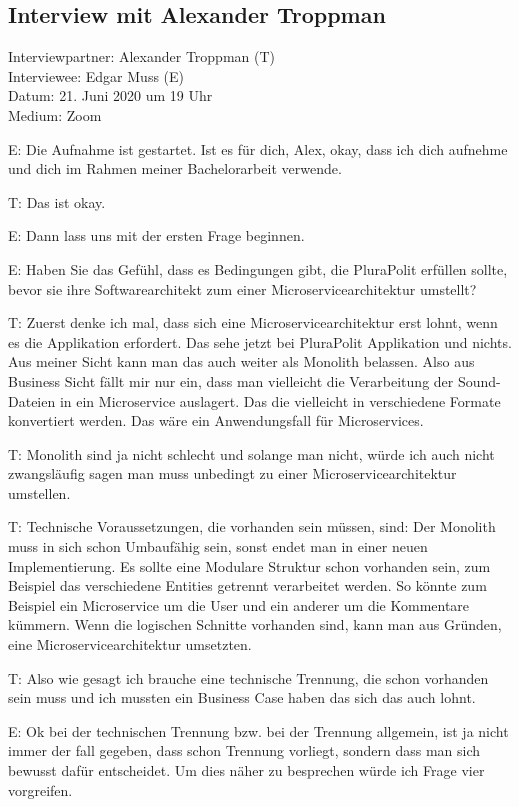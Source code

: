 \subsection{Interview mit Alexander Troppman}
\label{appendix:troppman}

Interviewpartner: Alexander Troppman (T) \\
Interviewee: Edgar Muss (E) \\
Datum: 21. Juni 2020 um 19 Uhr \\
Medium: Zoom

E: Die Aufnahme ist gestartet. Ist es für dich, Alex, okay, dass ich dich aufnehme und dich im Rahmen meiner Bachelorarbeit verwende.

T: Das ist okay.

E: Dann lass uns mit der ersten Frage beginnen.

E: Haben Sie das Gefühl, dass es Bedingungen gibt, die PluraPolit erfüllen sollte, bevor sie ihre Softwarearchitekt zum einer Microservicearchitektur umstellt? 

T: Zuerst denke ich mal, dass sich eine Microservicearchitektur erst lohnt, wenn es die Applikation erfordert. Das sehe jetzt bei PluraPolit Applikation und nichts. Aus meiner Sicht kann man das auch weiter als Monolith belassen.  Also aus Business Sicht fällt mir nur ein,  dass man vielleicht die Verarbeitung der Sound-Dateien in ein Microservice auslagert. Das die vielleicht in verschiedene Formate konvertiert werden. Das wäre ein Anwendungsfall für Microservices. 

T: Monolith sind ja nicht schlecht und solange man nicht, würde ich auch nicht zwangsläufig sagen man muss unbedingt zu einer Microservicearchitektur umstellen.

T: Technische Voraussetzungen, die vorhanden sein müssen, sind: Der Monolith muss in sich schon Umbaufähig sein, sonst endet man in einer neuen Implementierung. Es sollte eine Modulare Struktur schon vorhanden sein, zum Beispiel das verschiedene Entities getrennt verarbeitet werden. So könnte zum Beispiel ein Microservice um die User und ein anderer um  die Kommentare kümmern. Wenn die logischen Schnitte vorhanden sind, kann man aus Gründen, eine Microservicearchitektur umsetzten. 

\label{appendix:t-1} \label{appendix:t-2}
T: Also wie gesagt ich brauche eine technische Trennung, die schon vorhanden sein muss und ich mussten ein Business Case haben das sich das auch lohnt.

E: Ok bei der technischen Trennung bzw. bei der Trennung allgemein, ist ja nicht immer der fall gegeben, dass schon Trennung vorliegt, sondern dass man sich bewusst dafür entscheidet. Um dies näher zu besprechen würde ich Frage vier vorgreifen.

